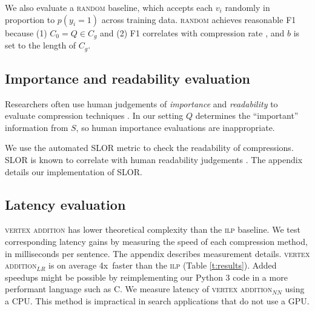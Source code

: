 \documentclass[11pt,a4paper]{article}
\newcommand{\speedup}[0]{4x~}
\begin{document}
{We also evaluate a \textsc{random} baseline, which accepts each $v_i$ randomly in proportion to $p(y_i = 1)$ across training data. \textsc{random} achieves reasonable F1 because (1) $C_0 = Q \in C_g$ and (2) F1 correlates with compression rate \cite{napoles2011evaluating}, and $b$ is set to the length of $C_g$.

\subsection{Importance and readability evaluation}\label{s:readabilityinformativeness}

Researchers often use human judgements of \textit{importance} and \textit{readability} to evaluate compression techniques \cite{Knight2000StatisticsBasedS,filippova2015sentence}. In our setting $Q$ determines the ``important'' information from $S$, so human importance evaluations are inappropriate.

We use the automated SLOR metric \cite{lau2015unsupervised} to check the readability of compressions. SLOR is known to correlate with human readability judgements \cite{kannConl}. The appendix details our implementation of SLOR.

\subsection{Latency evaluation}\label{s:costs}

\textsc{vertex addition} has lower theoretical complexity than the \textsc{ilp} baseline. We test corresponding latency gains by measuring the speed of each compression method, in milliseconds per sentence. The appendix describes measurement details. \textsc{vertex addition}$_{LR}$ is on average \speedup faster than the \textsc{ilp} (Table \ref{t:results}). Added speedups might be possible by reimplementing our Python 3 code in a more performant language such as C. We measure latency of \textsc{vertex addition}$_{NN}$ using a CPU. This method is impractical in search applications that do not use a GPU.

}
\end{document}
